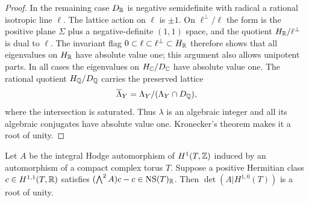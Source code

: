 \begin{proof}
In the remaining case \(D_\mathbb R\) is negative semidefinite with radical a
rational isotropic line \(\ell\).  The lattice action on \(\ell\) is
\(\pm1\).  On \(\ell^\perp/\ell\) the form is the positive plane
\(\Sigma\) plus a negative-definite \((1,1)\) space, and the quotient
\(H_\mathbb R/\ell^\perp\) is dual to \(\ell\).  The invariant flag
\(0\subset\ell\subset\ell^\perp\subset H_\mathbb R\) therefore shows that
all eigenvalues on \(H_\mathbb R\) have absolute value one; this argument also
allows unipotent parts.  In all cases the eigenvalues on
\(H_\mathbb C/D_\mathbb C\) have absolute value one.  The rational quotient
\(H_\mathbb Q/D_\mathbb Q\) carries the preserved lattice
\[
 \overline\Lambda_Y=\Lambda_Y/(\Lambda_Y\cap D_\mathbb Q),
\]
where the intersection is saturated.  Thus
\(\lambda\) is an algebraic integer and all its algebraic conjugates have
absolute value one.  Kronecker's theorem makes it a root of unity.
\end{proof}

\begin{lemma}\label{floor:torus-scalar}
Let \(A\) be the integral Hodge automorphism of \(H^1(T,\mathbb Z)\) induced
by an automorphism of a compact complex torus \(T\).  Suppose a positive
Hermitian class \(c\in H^{1,1}(T,\mathbb R)\) satisfies
\((\bigwedge^2 A)c-c\in\operatorname{NS}(T)_\mathbb R\).  Then
\(\det(A|H^{1,0}(T))\) is a root of unity.
\end{lemma}

